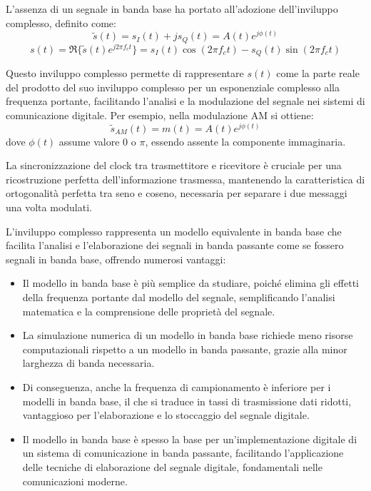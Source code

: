 L'assenza di un segnale in banda base ha portato all'adozione dell'inviluppo complesso, definito come:
\begin{equation}
    \tilde{s}(t) = s_I(t) + js_Q(t) = A(t)e^{j\phi(t)}
\end{equation}
\begin{equation}
    s(t) = \Re\{\tilde{s}(t)e^{j2\pi f_c t}\} = s_I(t)\cos(2\pi f_c t) - s_Q(t)\sin(2\pi f_c t)
\end{equation}

Questo inviluppo complesso permette di rappresentare \( s(t) \) come la parte reale del prodotto del suo inviluppo complesso per un esponenziale complesso alla frequenza portante, facilitando l'analisi e la modulazione del segnale nei sistemi di comunicazione digitale. Per esempio, nella modulazione AM si ottiene:
\begin{equation}
    \tilde{s}_{AM}(t) = m(t) = A(t)e^{j\phi(t)}
\end{equation}
dove \( \phi(t) \) assume valore \( 0 \) o \( \pi \), essendo assente la componente immaginaria.

La sincronizzazione del clock tra trasmettitore e ricevitore è cruciale per una ricostruzione perfetta dell'informazione trasmessa, mantenendo la caratteristica di ortogonalità perfetta tra seno e coseno, necessaria per separare i due messaggi una volta modulati.

L'inviluppo complesso rappresenta un modello equivalente in banda base che facilita l'analisi e l'elaborazione dei segnali in banda passante come se fossero segnali in banda base, offrendo numerosi vantaggi:
\begin{itemize}
    \item Il modello in banda base è più semplice da studiare, poiché elimina gli effetti della frequenza portante dal modello del segnale, semplificando l'analisi matematica e la comprensione delle proprietà del segnale.
    \item La simulazione numerica di un modello in banda base richiede meno risorse computazionali rispetto a un modello in banda passante, grazie alla minor larghezza di banda necessaria.
    \item Di conseguenza, anche la frequenza di campionamento è inferiore per i modelli in banda base, il che si traduce in tassi di trasmissione dati ridotti, vantaggioso per l'elaborazione e lo stoccaggio del segnale digitale.
    \item Il modello in banda base è spesso la base per un'implementazione digitale di un sistema di comunicazione in banda passante, facilitando l'applicazione delle tecniche di elaborazione del segnale digitale, fondamentali nelle comunicazioni moderne.
\end{itemize}

